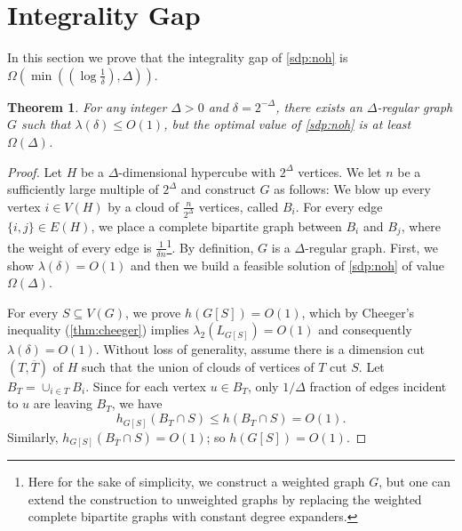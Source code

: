 \documentclass[11pt]{article}
\def\h{h}
\newtheorem{theorem}{Theorem}[section]
\begin{document}
\section{Integrality Gap}
In this section we prove that the integrality gap of \ref{sdp:noh} is  $\Omega(\min((\log \frac{1}{\delta}),\Delta))$. 
\begin{theorem}
\label{thm:IGfirst}
For any integer $\Delta > 0$ and $\delta=2^{-\Delta}$, there exists an $\Delta$-regular graph $G$ such that  $\lambda(\delta) \leq O(1)$, but the optimal value of \ref{sdp:noh} is at least $\Omega(\Delta)$.
\end{theorem}

\begin{proof}
Let $H$ be a $\Delta$-dimensional hypercube with $2^\Delta$ vertices. We let $n$ be a  sufficiently large multiple of $2^\Delta$ and construct $G$ as follows:   
We blow up every vertex $i \in V(H)$ by a cloud of  $\frac{ 
n}{2^\Delta}$ vertices, called $B_i$. For every edge $\{i,j\} \in E(H)$, 
we place a complete  bipartite graph between $B_i$ and $B_j$, where 
the weight of every edge is $\frac{1}{\delta n}$\footnote{Here for the sake of 
simplicity, we construct a weighted graph $G$, but one can extend the construction to unweighted graphs by replacing the weighted complete bipartite graphs with constant degree expanders.}.
By definition, $G$ is a $\Delta$-regular graph. First, we show $\lambda(\delta)=O(1)$ and then we 
build a feasible solution of \ref{sdp:noh} of value $
\Omega(\Delta)$.

For every $S \subseteq V(G)$, we prove $\h(G[S]) = O(1)$, which 
by Cheeger's inequality (\autoref{thm:cheeger}) implies $\lambda_2(L_{G[S]}) = O(1)$ and 
consequently $\lambda(\delta) = O(1)$.
 Without loss of generality, 
assume there is a  dimension cut $(T,\overline{T})$ of $H$ such that the union of clouds of vertices of $T$ cut $S$. Let $B_T=\cup_{i\in T} B_i$. Since for each vertex $u\in B_T$, only $1/\Delta$ fraction of edges incident to $u$ are leaving $B_T$, we have 
$$\h_{G[S]}(B_T\cap S)\leq \h(B_T\cap S) = O(1).$$
Similarly, $\h_{G[S]}(B_{\overline{T}}\cap S) = O(1)$; so $\h(G[S])=O(1)$. 


\end{proof}
\end{document}
